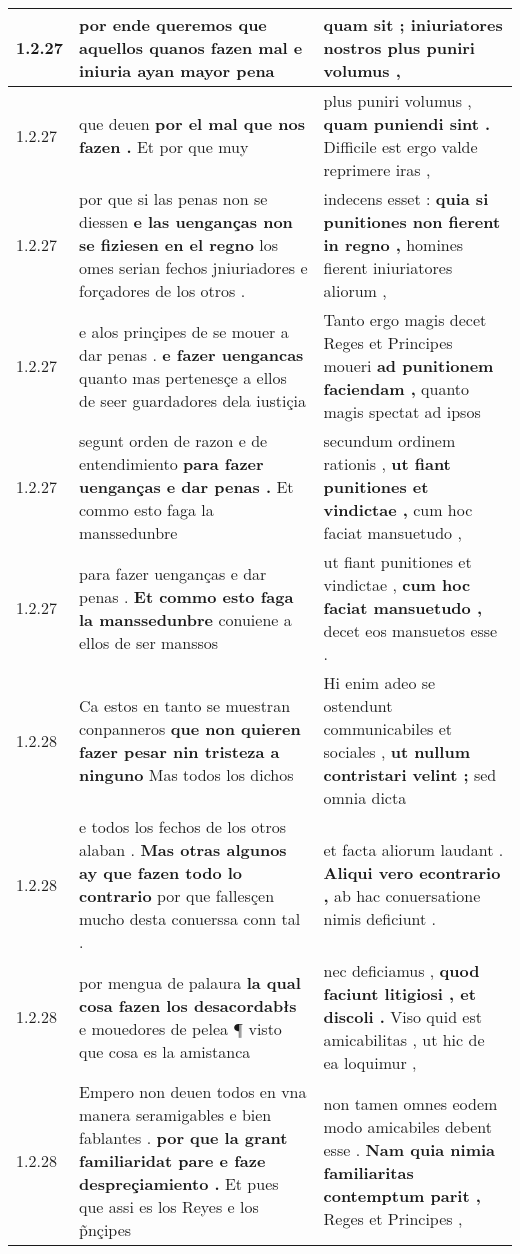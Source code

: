 \begin{tabular}{|p{1cm}|p{6.5cm}|p{6.5cm}|}
1.2.27 & por ende queremos \textbf{ que aquellos quanos fazen mal } e iniuria ayan mayor pena & quam sit ; \textbf{ iniuriatores nostros } plus puniri volumus , \\\hline
1.2.27 & que deuen \textbf{ por el mal que nos fazen . } Et por que muy & plus puniri volumus , \textbf{ quam puniendi sint . } Difficile est ergo valde reprimere iras , \\\hline
1.2.27 & por que si las penas non se diessen \textbf{ e las uenganças non se fiziesen en el regno } los omes serian fechos jniuriadores e forçadores de los otros . & indecens esset : \textbf{ quia si punitiones non fierent in regno , } homines fierent iniuriatores aliorum , \\\hline
1.2.27 & e alos prinçipes de se mouer a dar penas . \textbf{ e fazer uengancas } quanto mas pertenesçe a ellos de seer guardadores dela iustiçia & Tanto ergo magis decet Reges et Principes moueri \textbf{ ad punitionem faciendam , } quanto magis spectat ad ipsos \\\hline
1.2.27 & segunt orden de razon e de entendimiento \textbf{ para fazer uenganças e dar penas . } Et commo esto faga la manssedunbre & secundum ordinem rationis , \textbf{ ut fiant punitiones et vindictae , } cum hoc faciat mansuetudo , \\\hline
1.2.27 & para fazer uenganças e dar penas . \textbf{ Et commo esto faga la manssedunbre } conuiene a ellos de ser manssos & ut fiant punitiones et vindictae , \textbf{ cum hoc faciat mansuetudo , } decet eos mansuetos esse . \\\hline
1.2.28 & Ca estos en tanto se muestran conpanneros \textbf{ que non quieren fazer pesar nin tristeza a ninguno } Mas todos los dichos & Hi enim adeo se ostendunt communicabiles et sociales , \textbf{ ut nullum contristari velint ; } sed omnia dicta \\\hline
1.2.28 & e todos los fechos de los otros alaban . \textbf{ Mas otras algunos ay que fazen todo lo contrario } por que fallesçen mucho desta conuerssa conn tal . & et facta aliorum laudant . \textbf{ Aliqui vero econtrario , } ab hac conuersatione nimis deficiunt . \\\hline
1.2.28 & por mengua de palaura \textbf{ la qual cosa fazen los desacordabłs } e mouedores de pelea ¶ visto que cosa es la amistanca & nec deficiamus , \textbf{ quod faciunt litigiosi , et discoli . } Viso quid est amicabilitas , ut hic de ea loquimur , \\\hline
1.2.28 & Empero non deuen todos en vna manera seramigables e bien fablantes . \textbf{ por que la grant familiaridat pare e faze despreçiamiento . } Et pues que assi es los Reyes e los p̃nçipes & non tamen omnes eodem modo amicabiles debent esse . \textbf{ Nam quia nimia familiaritas contemptum parit , } Reges et Principes , \\\hline

\end{tabular}
